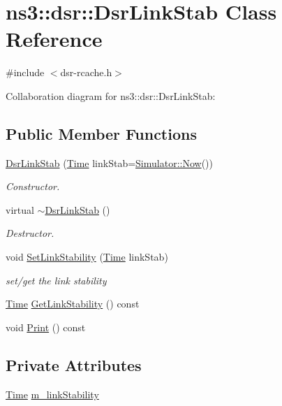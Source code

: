 \hypertarget{classns3_1_1dsr_1_1DsrLinkStab}{}\section{ns3\+:\+:dsr\+:\+:Dsr\+Link\+Stab Class Reference}
\label{classns3_1_1dsr_1_1DsrLinkStab}


{\ttfamily \#include $<$dsr-\/rcache.\+h$>$}



Collaboration diagram for ns3\+:\+:dsr\+:\+:Dsr\+Link\+Stab\+:
\subsection*{Public Member Functions}
\begin{DoxyCompactItemize}
\item 
\hyperlink{classns3_1_1dsr_1_1DsrLinkStab_a0e269b834766d6c44afad3f3c8e9bfce}{Dsr\+Link\+Stab} (\hyperlink{classns3_1_1Time}{Time} link\+Stab=\hyperlink{classns3_1_1Simulator_ac3178fa975b419f7875e7105be122800}{Simulator\+::\+Now}())
\begin{DoxyCompactList}\small\item\em Constructor. \end{DoxyCompactList}\item 
virtual \hyperlink{classns3_1_1dsr_1_1DsrLinkStab_ac778c11cffc582ed3ef04773523d03e3}{$\sim$\+Dsr\+Link\+Stab} ()
\begin{DoxyCompactList}\small\item\em Destructor. \end{DoxyCompactList}\item 
void \hyperlink{classns3_1_1dsr_1_1DsrLinkStab_a3ce3dbb6969208d234363a3b57135dc6}{Set\+Link\+Stability} (\hyperlink{classns3_1_1Time}{Time} link\+Stab)
\begin{DoxyCompactList}\small\item\em set/get the link stability \end{DoxyCompactList}\item 
\hyperlink{classns3_1_1Time}{Time} \hyperlink{classns3_1_1dsr_1_1DsrLinkStab_a3e63b296a9df220db2963ae64b441338}{Get\+Link\+Stability} () const 
\item 
void \hyperlink{classns3_1_1dsr_1_1DsrLinkStab_a85d36534071d879ef4536cdf0c78cc19}{Print} () const 
\end{DoxyCompactItemize}
\subsection*{Private Attributes}
\begin{DoxyCompactItemize}
\item 
\hyperlink{classns3_1_1Time}{Time} \hyperlink{classns3_1_1dsr_1_1DsrLinkStab_a8628cc9bb3c2513864db8261ff622adf}{m\+\_\+link\+Stability}
\end{DoxyCompactItemize}


